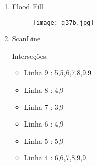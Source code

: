 \begin{enumerate}[label=\arabic*)]
\begin{enumerate}[label=\alph*.]
					\item Flood Fill 
					
					 \begin{figure}[ht]
      						\centering
      						\texttt{[image: q37b.jpg]}
  					\end{figure}

					\newpage
		
					\item ScanLine 					
					
					Interseções: 
					\begin{itemize}
						\item Linha 9 : 5,5,6,7,8,9,9
						\item Linha 8 : 4,9
						\item Linha 7 : 3,9
						\item Linha 6 : 4,9
						\item Linha 5 : 5,9
						\item Linha 4 : 6,6,7,8,9,9
					\end{itemize}
  					
 			  \end{enumerate}
 			 
   \end{enumerate}
